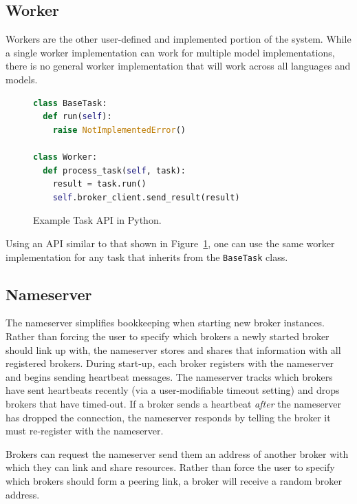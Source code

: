 \documentclass[conference]{IEEEtran}
\begin{document}
\subsection{Worker}
Workers are the other user-defined and implemented portion of the system. While
a single worker implementation can work for multiple model implementations, there
is no general worker implementation that will work across all languages and models.

\begin{figure}
  \begin{lstlisting}[language=python]
class BaseTask:
  def run(self):
    raise NotImplementedError()

class Worker:
  def process_task(self, task):
    result = task.run()
    self.broker_client.send_result(result)
  \end{lstlisting}
  \caption{Example Task API in Python.}\label{fig:python-api}
\end{figure}

Using an API similar to that shown in Figure~\ref{fig:python-api}, one can use
the same worker implementation for any task that inherits from the \texttt{BaseTask}
class.

\subsection{Nameserver}
The nameserver simplifies bookkeeping when starting new broker instances.
Rather than forcing the user to specify which brokers a newly started broker
should link up with, the nameserver stores and shares that information with
all registered brokers. During start-up, each broker registers with the nameserver
and begins sending heartbeat messages. The nameserver tracks which brokers have
sent heartbeats recently (via a user-modifiable timeout setting) and drops brokers
that have timed-out. If a broker sends a heartbeat \emph{after} the nameserver has
dropped the connection, the nameserver responds by telling the broker it must
re-register with the nameserver.

Brokers can request the nameserver send them an address of another broker with
which they can link and share resources. Rather than force the user to specify
which brokers should form a peering link, a broker will receive a random broker
address.
\end{document}
